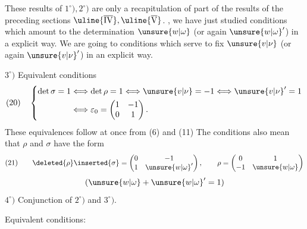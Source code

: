 These results of $1^\circ),2^\circ)$ are only a recapitulation of part of the results of the preceding sections $\uline{\overline{\mathrm{IV}}},\uline{\overline{\mathrm{V}}}$. , we have just studied conditions which amount to the determination  $\unsure{w|\omega}$ (or again  $\unsure{w|\omega}'$) in a  explicit way. We are going to  conditions which  serve to fix $\unsure{v|\nu}$ (or again $\unsure{v|\nu}'$) in an explicit way.

$3^\circ)$ Equivalent conditions
\[
(20)\quad\left\{\begin{aligned}
\det\sigma=1&\Longleftrightarrow\det\rho=1\Longleftrightarrow \unsure{v|\nu}=-1\Longleftrightarrow \unsure{v|\nu}'=1\\
&\Longleftrightarrow\varepsilon_0=\begin{pmatrix}1&-1\\0&1\end{pmatrix}.
\end{aligned}\right.
\]
These equivalences follow at once from (6) and (11) The conditions also mean that $\rho$ and $\sigma$ have the form
\[
(21)\qquad \deleted{\rho}\inserted{\sigma}=\begin{pmatrix}0&-1\\1&\unsure{w|\omega}'\end{pmatrix},\qquad\rho=\begin{pmatrix}0&1\\-1&\unsure{w|\omega}\end{pmatrix}
\]
\[
(\unsure{w|\omega}+\unsure{w|\omega}'=1)
\]
$4^\circ)$ Conjunction of $2^\circ)$ and $3^\circ)$.

Equivalent conditions:


